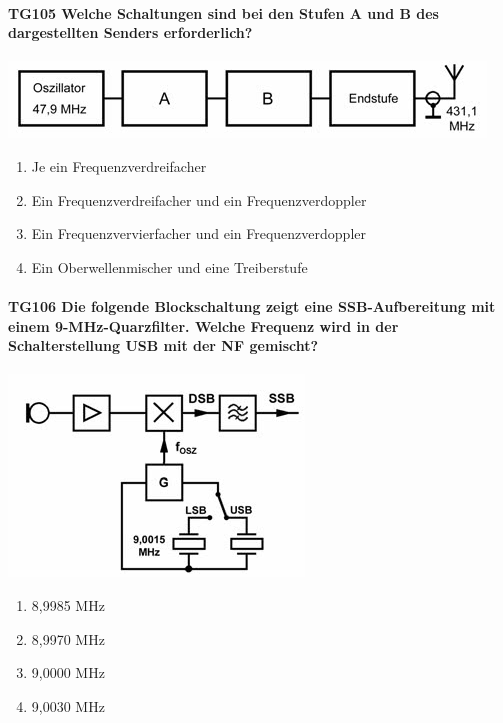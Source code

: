 \documentclass[8pt]{article}
\begin{document}
\paragraph*{TG105 Welche Schaltungen sind bei den Stufen A und B des dargestellten Senders erforderlich?}
\begin{center}
	\begin{minipage}{\linewidth}
		\centering
		\includegraphics[scale=1.0]{pics/tg105_a.jpg}
	\end{minipage}
\end{center}
\begin{enumerate}[nolistsep,label=\Alph*]
\item Je ein Frequenzverdreifacher
\item Ein Frequenzverdreifacher und ein Frequenzverdoppler
\item Ein Frequenzvervierfacher und ein Frequenzverdoppler
\item Ein Oberwellenmischer und eine Treiberstufe
\end{enumerate}

\paragraph*{TG106 Die folgende Blockschaltung zeigt eine SSB-Aufbereitung mit einem 9-MHz-Quarzfilter. Welche Frequenz wird in der Schalterstellung USB mit der NF gemischt?}
\begin{center}
	\begin{minipage}{\linewidth}
		\centering
		\includegraphics[scale=1.0]{pics/tg106_a.jpg}
	\end{minipage}
\end{center}
\begin{enumerate}[nolistsep,label=\Alph*]
\item 8,9985 MHz
\item 8,9970 MHz
\item 9,0000 MHz
\item 9,0030 MHz
\end{enumerate}
\end{document}
